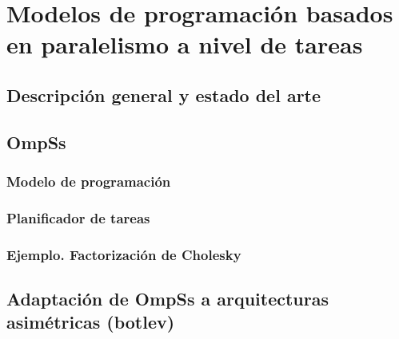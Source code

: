 \newpage
\thispagestyle{empty}
\mbox{}

\chapter{Modelos de programación basados en paralelismo a nivel de tareas}
\label{ch:chapter3}

\section{Descripción general y estado del arte}

\section{OmpSs}

\subsection{Modelo de programación}

\subsection{Planificador de tareas}

\subsection{Ejemplo. Factorización de Cholesky}

\section{Adaptación de OmpSs a arquitecturas asimétricas (botlev)}
